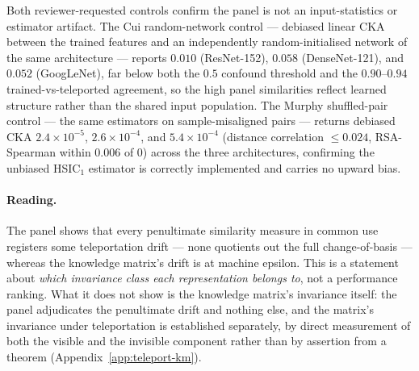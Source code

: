 Both reviewer-requested controls confirm the panel is not an
input-statistics or estimator artifact. The Cui random-network control ---
debiased linear CKA between the trained features and an independently
random-initialised network of the same architecture --- reports $0.010$
(ResNet-152), $0.058$ (DenseNet-121), and $0.052$ (GoogLeNet), far below
both the $0.5$ confound threshold and the $0.90$--$0.94$
trained-vs-teleported agreement, so the high panel similarities reflect
learned structure rather than the shared input population. The Murphy
shuffled-pair control --- the same estimators on sample-misaligned pairs
--- returns debiased CKA $2.4\times10^{-5}$, $2.6\times10^{-4}$, and
$5.4\times10^{-4}$ (distance correlation $\le 0.024$, RSA-Spearman within
$0.006$ of $0$) across the three architectures, confirming the unbiased
HSIC$_1$ estimator is correctly implemented and carries no upward bias.

\paragraph{Reading.}
The panel shows that every penultimate similarity measure in common use
registers some teleportation drift --- none quotients out the full
change-of-basis --- whereas the knowledge matrix's drift is at machine epsilon.
This is a statement about \emph{which invariance class each representation
belongs to}, not a performance ranking. What it does not show is the knowledge
matrix's invariance itself: the panel adjudicates the penultimate drift and
nothing else, and the matrix's invariance under teleportation is established
separately, by direct measurement of both the visible and the invisible component
rather than by assertion from a theorem (Appendix~\ref{app:teleport-km}).
